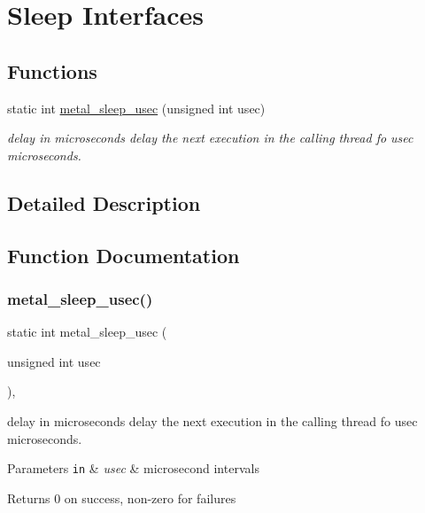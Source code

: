 \hypertarget{group__sleep}{}\section{Sleep Interfaces}
\label{group__sleep}
\subsection*{Functions}
\begin{DoxyCompactItemize}
\item 
static int \hyperlink{group__sleep_ga461945ab921677ce0aeefe24ee74eace}{metal\+\_\+sleep\+\_\+usec} (unsigned int usec)
\begin{DoxyCompactList}\small\item\em delay in microseconds delay the next execution in the calling thread fo usec microseconds. \end{DoxyCompactList}\end{DoxyCompactItemize}


\subsection{Detailed Description}


\subsection{Function Documentation}
\mbox{\label{group__sleep_ga461945ab921677ce0aeefe24ee74eace}} 
\subsubsection{\texorpdfstring{metal\+\_\+sleep\+\_\+usec()}{metal\_sleep\_usec()}}
{\footnotesize\ttfamily static int metal\+\_\+sleep\+\_\+usec (\begin{DoxyParamCaption}\item[{unsigned int}]{usec }\end{DoxyParamCaption})\hspace{0.3cm}{\ttfamily [inline]}, {\ttfamily [static]}}



delay in microseconds delay the next execution in the calling thread fo usec microseconds. 


\begin{DoxyParams}[1]{Parameters}
\mbox{\tt in}  & {\em usec} & microsecond intervals \\
\hline
\end{DoxyParams}
\begin{DoxyReturn}{Returns}
0 on success, non-\/zero for failures 
\end{DoxyReturn}

